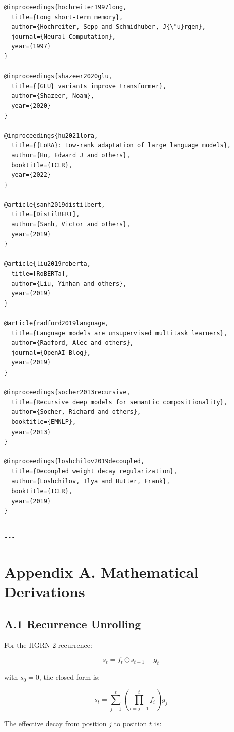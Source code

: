 \begin{lstlisting}
@inproceedings{hochreiter1997long,
  title={Long short-term memory},
  author={Hochreiter, Sepp and Schmidhuber, J{\"u}rgen},
  journal={Neural Computation},
  year={1997}
}

@inproceedings{shazeer2020glu,
  title={{GLU} variants improve transformer},
  author={Shazeer, Noam},
  year={2020}
}

@inproceedings{hu2021lora,
  title={{LoRA}: Low-rank adaptation of large language models},
  author={Hu, Edward J and others},
  booktitle={ICLR},
  year={2022}
}

@article{sanh2019distilbert,
  title=[DistilBERT],
  author={Sanh, Victor and others},
  year={2019}
}

@article{liu2019roberta,
  title=[RoBERTa],
  author={Liu, Yinhan and others},
  year={2019}
}

@article{radford2019language,
  title={Language models are unsupervised multitask learners},
  author={Radford, Alec and others},
  journal={OpenAI Blog},
  year={2019}
}

@inproceedings{socher2013recursive,
  title={Recursive deep models for semantic compositionality},
  author={Socher, Richard and others},
  booktitle={EMNLP},
  year={2013}
}

@inproceedings{loshchilov2019decoupled,
  title={Decoupled weight decay regularization},
  author={Loshchilov, Ilya and Hutter, Frank},
  booktitle={ICLR},
  year={2019}
}
\end{lstlisting}
\begin{lstlisting}

---
\end{lstlisting}

\section{Appendix A. Mathematical Derivations}

\subsection{A.1 Recurrence Unrolling}

For the HGRN-2 recurrence:

\[
s_t = f_t \odot s_{t-1} + g_t
\tag{A.1}
\]

with $s_0 = 0$, the closed form is:

\[
s_t = \sum_{j=1}^{t} \left( \prod_{i=j+1}^{t} f_i \right) g_j
\tag{A.2}
\]

The effective decay from position $j$ to position $t$ is:

